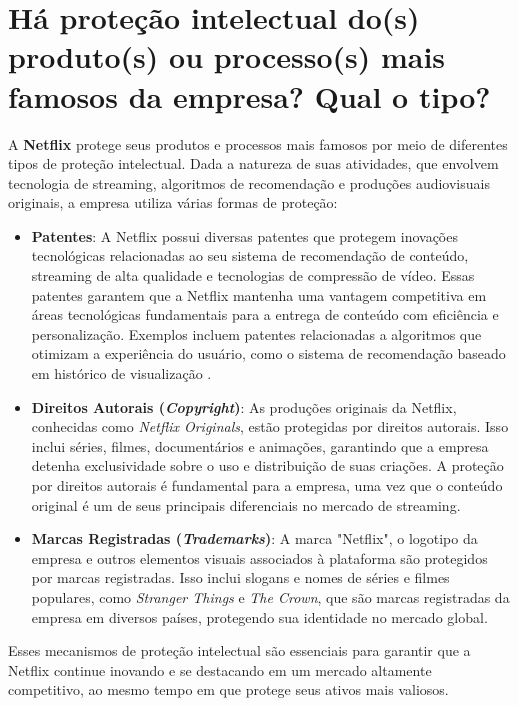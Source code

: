 \section{Há proteção intelectual do(s) produto(s) ou processo(s) mais famosos da empresa? Qual o tipo?}

A \textbf{Netflix} protege seus produtos e processos mais famosos por meio de diferentes tipos de proteção intelectual. Dada a natureza de suas atividades, que envolvem tecnologia de streaming, algoritmos de recomendação e produções audiovisuais originais, a empresa utiliza várias formas de proteção:

\begin{itemize}
    \item \textbf{Patentes}: A Netflix possui diversas patentes que protegem inovações tecnológicas relacionadas ao seu sistema de recomendação de conteúdo, streaming de alta qualidade e tecnologias de compressão de vídeo. Essas patentes garantem que a Netflix mantenha uma vantagem competitiva em áreas tecnológicas fundamentais para a entrega de conteúdo com eficiência e personalização. Exemplos incluem patentes relacionadas a algoritmos que otimizam a experiência do usuário, como o sistema de recomendação baseado em histórico de visualização \cite{netflix_patentes}.

    \item \textbf{Direitos Autorais (\textit{Copyright})}: As produções originais da Netflix, conhecidas como \textit{Netflix Originals}, estão protegidas por direitos autorais. Isso inclui séries, filmes, documentários e animações, garantindo que a empresa detenha exclusividade sobre o uso e distribuição de suas criações. A proteção por direitos autorais é fundamental para a empresa, uma vez que o conteúdo original é um de seus principais diferenciais no mercado de streaming.

    \item \textbf{Marcas Registradas (\textit{Trademarks})}: A marca "Netflix", o logotipo da empresa e outros elementos visuais associados à plataforma são protegidos por marcas registradas. Isso inclui slogans e nomes de séries e filmes populares, como \textit{Stranger Things} e \textit{The Crown}, que são marcas registradas da empresa em diversos países, protegendo sua identidade no mercado global.

\end{itemize}

Esses mecanismos de proteção intelectual são essenciais para garantir que a Netflix continue inovando e se destacando em um mercado altamente competitivo, ao mesmo tempo em que protege seus ativos mais valiosos.
